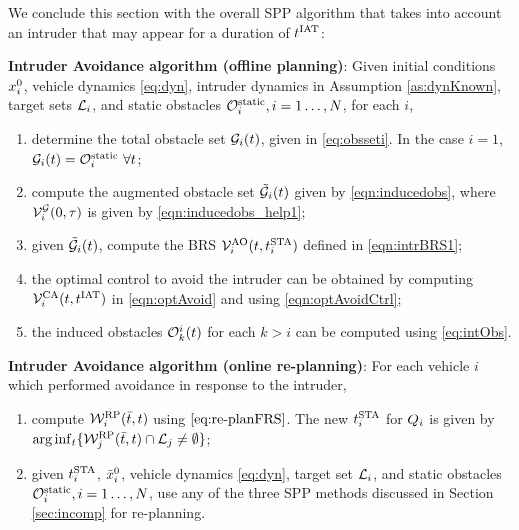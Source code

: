 We conclude this section with the overall SPP algorithm that takes into account an intruder that may appear for a duration of $t^\text{IAT}$: 
\begin{alg}
\label{alg:intruder}
\textbf{Intruder Avoidance algorithm (offline planning)}: Given initial conditions $x_i^0$, vehicle dynamics \eqref{eq:dyn}, intruder dynamics in Assumption \ref{as:dynKnown}, target sets $\mathcal{L}_i$, and static obstacles $\mathcal{O}^\text{static}_i, i = 1\ldots, N$, for each $i$,
\begin{enumerate}
\item determine the total obstacle set $\mathcal{G}_i(t)$, given in \eqref{eq:obsseti}. In the case $i=1$, $\mathcal{G}_i(t) = \mathcal{O}^\text{static}_i ~ \forall t$;
\item compute the augmented obstacle set $\tilde{\mathcal{G}}_i(t)$ given by \eqref{eqn:inducedobs}, where $\mathcal{V}^{\mathcal{G}}_{i}(0, \tau)$ is given by \eqref{eqn:inducedobs_help1};
\item given $\tilde{\mathcal{G}}_i(t)$, compute the BRS $\mathcal{V}^{\text{AO}}_{i}(t, t^\text{STA}_i)$ defined in \eqref{eqn:intrBRS1};
\item the optimal control to avoid the intruder can be obtained by computing $\mathcal{V}^{\text{CA}}_{i}(t, t^\text{IAT})$ in \eqref{eqn:optAvoid} and using \eqref{eqn:optAvoidCtrl};
\item the induced obstacles $\mathcal{O}_k^i(t)$ for each $k>i$ can be computed using \eqref{eq:intObs}.
\end{enumerate}

\textbf{Intruder Avoidance algorithm (online re-planning)}: For each vehicle $i$ which performed avoidance in response to the intruder,
\begin{enumerate}
\item compute $\mathcal{W}_i^{\text{RP}}(\bar{t}, t)$ using $\eqref{eq:re-planFRS}$. The new $t^\text{STA}_i$ for $Q_i$ is given by $\arg \inf_t \{ \mathcal{W}_j^{\text{RP}}(\bar{t}, t) \cap \mathcal{L}_j \neq \emptyset \}$;
\item given $t^\text{STA}_i$, $\tilde{x}_i^0$, vehicle dynamics \eqref{eq:dyn}, target set $\mathcal{L}_i$, and static obstacles $\mathcal{O}^\text{static}_i, i = 1\ldots, N$, use any of the three SPP methods discussed in Section \ref{sec:incomp} for re-planning. 
\end{enumerate}
\end{alg}